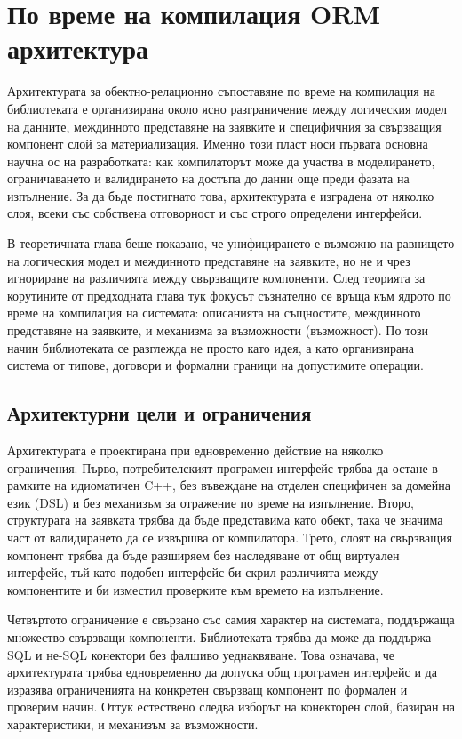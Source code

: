 \section{По време на компилация ORM архитектура}
\label{sec:architecture}

Архитектурата за обектно-релационно съпоставяне по време на компилация на библиотеката е организирана около ясно разграничение между логическия модел на данните, междинното представяне на заявките и специфичния за свързващия компонент слой за материализация. Именно този пласт носи първата основна научна ос на разработката: как компилаторът може да участва в моделирането, ограничаването и валидирането на достъпа до данни още преди фазата на изпълнение. За да бъде постигнато това, архитектурата е изградена от няколко слоя, всеки със собствена отговорност и със строго определени интерфейси.

В теоретичната глава беше показано, че унифицирането е възможно на равнището на логическия модел и междинното представяне на заявките, но не и чрез игнориране на различията между свързващите компоненти. След теорията за корутините от предходната глава тук фокусът съзнателно се връща към ядрото по време на компилация на системата: описанията на същностите, междинното представяне на заявките,  и механизма за възможности (възможност). По този начин библиотеката се разглежда не просто като идея, а като организирана система от типове, договори и формални граници на допустимите операции.

\subsection{Архитектурни цели и ограничения}

Архитектурата е проектирана при едновременно действие на няколко ограничения. Първо, потребителският програмен интерфейс трябва да остане в рамките на идиоматичен C++, без въвеждане на отделен специфичен за домейна език (DSL) и без механизъм за отражение по време на изпълнение. Второ, структурата на заявката трябва да бъде представима като  обект, така че значима част от валидирането да се извършва от компилатора. Трето, слоят на свързващия компонент трябва да бъде разширяем без наследяване от общ виртуален интерфейс, тъй като подобен интерфейс би скрил различията между компонентите и би изместил проверките към времето на изпълнение.

Четвъртото ограничение е свързано със самия характер на системата, поддържаща множество свързващи компоненти. Библиотеката трябва да може да поддържа SQL и не-SQL конектори без фалшиво уеднаквяване. Това означава, че архитектурата трябва едновременно да допуска общ програмен интерфейс и да изразява ограниченията на конкретен свързващ компонент по формален и проверим начин. Оттук естествено следва изборът на конекторен слой, базиран на характеристики, и механизъм за възможности.

